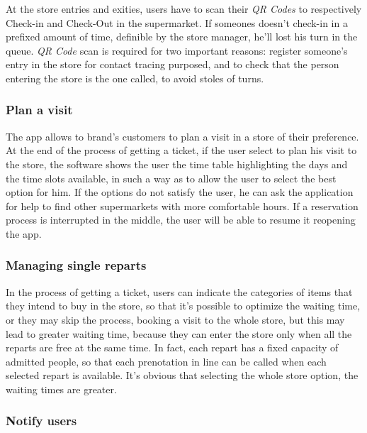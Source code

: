 \documentclass{article}
\begin{document}
		At the store entries and exities, users have to scan their \emph{QR Codes} to respectively Check-in and Check-Out in the supermarket. If someones doesn't check-in in a prefixed amount of time, definible by the store manager, he'll lost his turn in the queue. \emph{QR Code} scan is required for two important reasons: register someone's entry in the store for contact tracing purposed, and to check that the person entering the store is the one called, to avoid stoles of turns. \\
		
		\subsubsection{Plan a visit}
		
		The app allows to brand's customers to plan a visit in a store of their preference. At the end of the process of getting a ticket, if the user select to plan his visit to the store, the software shows the user the time table highlighting the days and the time slots available, in such a way as to allow the user to select the best option for him. If the options do not satisfy the user, he can ask the application for help to find other supermarkets with more comfortable hours. If a reservation process is interrupted in the middle, the user will be able to resume it reopening the app. \\
		
		\subsubsection{Managing single reparts}
		
		In the process of getting a ticket, users can indicate the categories of items that they intend to buy in the store, so that it's possible to optimize the waiting time, or they may skip the process, booking a visit to the whole store, but this may lead to greater waiting time, because they can enter the store only when all the reparts are free at the same time. In fact, each repart has a fixed capacity of admitted people, so that each prenotation in line can be called when each selected repart is available. It's obvious that selecting the whole store option, the waiting times are greater. \\
		
		\subsubsection{Notify users}
		
\end{document}
